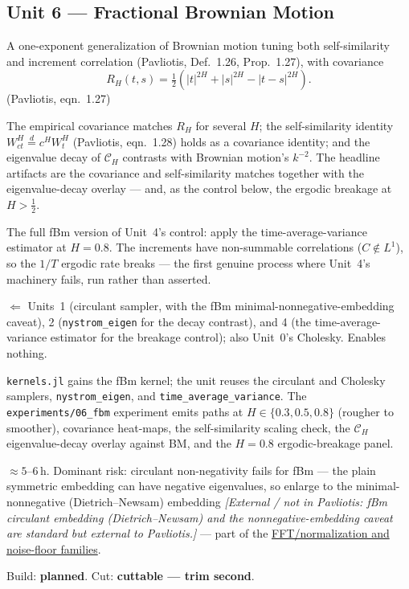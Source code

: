 \documentclass[11pt]{article}
\newcommand{\extnote}[1]{{\small\color{extgray}\emph{[External / not in Pavliotis: #1]}}}
\newcommand{\pav}[1]{{\small\color{hubblue}(Pavliotis, #1)}}
\newenvironment{brief}{%
  \begin{description}[style=sameline,leftmargin=2.3cm,font=\bfseries\color{hubblue}]
}{%
  \end{description}
}
\begin{document}
\subsection*{Unit 6 --- Fractional Brownian Motion}
\begin{brief}
\item[Idea] A one-exponent generalization of Brownian motion tuning both self-similarity and increment
correlation \pav{Def.~1.26, Prop.~1.27}, with covariance
\begin{equation}
R_H(t,s) = \tfrac{1}{2}\left(|t|^{2H} + |s|^{2H} - |t-s|^{2H}\right).
\label{eq:fbm}
\end{equation}
\pav{eqn.~1.27}
\item[Proves] The empirical covariance matches $R_H$ for several $H$; the self-similarity identity
$W^H_{ct}\overset{d}{=}c^{H}W^H_t$ \pav{eqn.~1.28} holds as a covariance identity; and the eigenvalue
decay of $\mathcal{C}_H$ contrasts with Brownian motion's $k^{-2}$. The headline artifacts are the
covariance and self-similarity matches together with the eigenvalue-decay overlay --- and, as the
control below, the ergodic breakage at $H>\tfrac12$.
\item[Falsifier] The full fBm version of Unit~4's control: apply the time-average-variance estimator
at $H=0.8$. The increments have non-summable correlations ($C\notin L^1$), so the $1/T$ ergodic rate
breaks --- the first genuine process where Unit~4's machinery fails, run rather than asserted.
\item[Depends on / enables] $\Leftarrow$ Units~1 (circulant sampler, with the fBm
minimal-nonnegative-embedding caveat), 2 (\texttt{nystrom\_eigen} for the decay contrast), and 4
(the time-average-variance estimator for the breakage control); also Unit~0's Cholesky. Enables
nothing.
\item[Deliverable shape] \texttt{kernels.jl} gains the fBm kernel; the unit reuses the circulant and
Cholesky samplers, \texttt{nystrom\_eigen}, and \texttt{time\_average\_variance}. The
\texttt{experiments/06\_fbm} experiment emits paths at $H\in\{0.3,0.5,0.8\}$ (rougher to smoother),
covariance heat-maps, the self-similarity scaling check, the $\mathcal{C}_H$ eigenvalue-decay overlay
against BM, and the $H=0.8$ ergodic-breakage panel.
\item[Effort \& risk] $\approx 5$--$6$\,h. Dominant risk: circulant non-negativity fails for fBm ---
the plain symmetric embedding can have negative eigenvalues, so enlarge to the minimal-nonnegative
(Dietrich--Newsam) embedding \extnote{fBm circulant embedding (Dietrich--Newsam) and the
nonnegative-embedding caveat are standard but external to Pavliotis.} --- part of the
\hyperref[sec:risk]{FFT/normalization and noise-floor families}.
\item[Status] Build: \textbf{planned}. Cut: \textbf{cuttable --- trim second}.
\end{brief}
\end{document}
